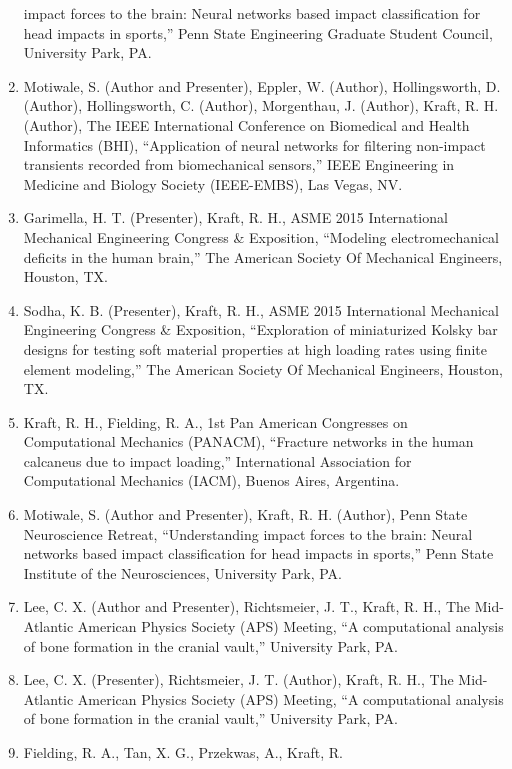 \documentclass[11pt]{article}
\begin{document}
\begin{enumerate}
  impact forces to the brain: Neural networks based impact
  classification for head impacts in sports,'' Penn State Engineering
  Graduate Student Council, University Park, PA.
\item
  Motiwale, S. 
(Author and Presenter), Eppler, W. 
(Author),
  Hollingsworth, D. 
(Author), Hollingsworth, C. 
(Author), Morgenthau, J.
  (Author), Kraft, R. 
H. 
(Author), The IEEE International Conference on
  Biomedical and Health Informatics (BHI), ``Application of neural
  networks for filtering non-impact transients recorded from
  biomechanical sensors,'' IEEE Engineering in Medicine and Biology
  Society (IEEE-EMBS), Las Vegas, NV.
\item
  Garimella, H. 
T. 
(Presenter), Kraft, R. 
H., ASME 2015 International
  Mechanical Engineering Congress \& Exposition, ``Modeling
  electromechanical deficits in the human brain,'' The American Society
  Of Mechanical Engineers, Houston, TX.
\item
  Sodha, K. 
B. 
(Presenter), Kraft, R. 
H., ASME 2015 International
  Mechanical Engineering Congress \& Exposition, ``Exploration of
  miniaturized Kolsky bar designs for testing soft material properties
  at high loading rates using finite element modeling,'' The American
  Society Of Mechanical Engineers, Houston, TX.
\item
  Kraft, R. 
H., Fielding, R. 
A., 1st Pan American Congresses on
  Computational Mechanics (PANACM), ``Fracture networks in the human
  calcaneus due to impact loading,'' International Association for
  Computational Mechanics (IACM), Buenos Aires, Argentina.
\item
  Motiwale, S. 
(Author and Presenter), Kraft, R. 
H. 
(Author), Penn State
  Neuroscience Retreat, ``Understanding impact forces to the brain:
  Neural networks based impact classification for head impacts in
  sports,'' Penn State Institute of the Neurosciences, University Park,
  PA.
\item
  Lee, C. 
X. 
(Author and Presenter), Richtsmeier, J. 
T., Kraft, R. 
H.,
  The Mid-Atlantic American Physics Society (APS) Meeting, ``A
  computational analysis of bone formation in the cranial vault,''
  University Park, PA.
\item
  Lee, C. 
X. 
(Presenter), Richtsmeier, J. 
T. 
(Author), Kraft, R. 
H., The
  Mid-Atlantic American Physics Society (APS) Meeting, ``A computational
  analysis of bone formation in the cranial vault,'' University Park, PA.
\item
  Fielding, R. 
A., Tan, X. 
G., Przekwas, A., Kraft, R. 

\end{enumerate}
\end{document}
